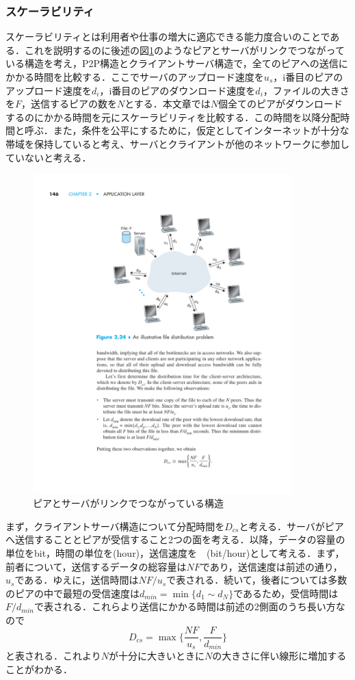 \documentclass[9pt,a4j,twocolumn]{jsarticle}
\begin{document}
\subsubsection{スケーラビリティ}
スケーラビリティとは利用者や仕事の増大に適応できる能力度合いのことである．これを説明するのに後述の図\ref{fig:file_distribution}のようなピアとサーバがリンクでつながっている構造を考え，P2P構造とクライアントサーバ構造で，全てのピアへの送信にかかる時間を比較する．ここでサーバのアップロード速度を$u_s$，i番目のピアのアップロード速度を$d_i$，i番目のピアのダウンロード速度を$d_i$，ファイルの大きさを$F$，送信するピアの数を$N$とする．本文章では$N$個全てのピアがダウンロードするのにかかる時間を元にスケーラビリティを比較する．この時間を以降分配時間と呼ぶ．また，条件を公平にするために，仮定としてインターネットが十分な帯域を保持していると考え、サーバとクライアントが他のネットワークに参加していないと考える．
\begin{figure}[tb]
\includegraphics[width=10cm,pagebox=cropbox,clip]{FileDistribution.pdf}
 \caption{ピアとサーバがリンクでつながっている構造}
 \label{fig:file_distribution}
\end{figure}
まず，クライアントサーバ構造について分配時間を${D}_{cs}$と考える．サーバがピアへ送信することとピアが受信すること2つの面を考える．以降，データの容量の単位をbit，時間の単位を(hour)，送信速度を　(bit/hour)として考える．まず，前者について，送信するデータの総容量は$NF$であり，送信速度は前述の通り，$u_s$である．ゆえに，送信時間は$NF/u_s$で表される．続いて，後者については多数のピアの中で最短の受信速度は${d}_{min} = \min \{d_1 \sim d_N\}$であるため，受信時間は$F/{d}_{min}$で表される．これらより送信にかかる時間は前述の2側面のうち長い方なので
\begin{equation}
{D}_{cs}=\max \{ \frac{NF}{u_s}, \frac{F}{{d}_{min}} \}
\label{eq:cs}
\end{equation}
と表される．これより$N$が十分に大きいときに$N$の大きさに伴い線形に増加することがわかる．
\end{document}
